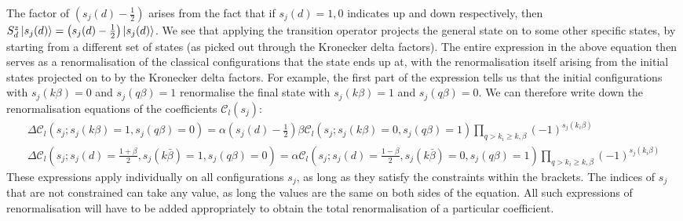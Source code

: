 \documentclass[prb]{revtex4-2}
\begin{document}
The factor of \(\left(s_j(d) - \frac{1}{2}\right)\) arises from the fact that if \(s_j(d)=1,0\) indicates up and down respectively, then \(S_d^z\ket{s_j(d)} = \left(s_j(d) - \frac{1}{2}\right)\ket{s_j(d)}\). We see that applying the transition operator projects the general state on to some other specific states, by starting from a different set of states (as picked out through the Kronecker delta factors). The entire expression in the above equation then serves as a renormalisation of the classical configurations that the state ends up at, with the renormalisation itself arising from the initial states projected on to by the Kronecker delta factors. For example, the first part of the expression tells us that the initial configurations with \(s_j(k\beta) = 0\) and \(s_j(q\beta)=1\) renormalise the final state with \(s_j(k\beta)=1\) and \(s_j(q\beta)=0\). We can therefore write down the renormalisation equations of the coefficients \(\mathcal{C}_l(s_j)\):
\begin{gather}
	  \Delta \mathcal{C}_l\left(s_j;s_j(k\beta) = 1, s_j(q\beta)=0\right) = \alpha \left(s_j(d) - \frac{1}{2}\right) \beta \mathcal{C}_l\left(s_j;s_j(k\beta) = 0, s_j(q\beta)=1\right)\prod_{q > k_i \geq k,\beta}\left( -1 \right)^{s_j(k_i\beta)}\label{particle_renormalisation1}\\
	\Delta \mathcal{C}_l\left(s_j;s_j(d) = \frac{1 + \beta}{2}, s_j(k\bar\beta) = 1, s_j(q\beta)=0\right) = \alpha \mathcal{C}_l\left(s_j;s_j(d) = \frac{1 - \beta}{2}, s_j(k\bar\beta) = 0, s_j(q\beta)=1\right)\prod_{q > k_i \geq k,\beta}\left( -1 \right)^{s_j(k_i\beta)}\label{particle_renormalisation2}
\end{gather}
These expressions apply individually on all configurations \(s_j\), as long as they satisfy the constraints within the brackets. The indices of \(s_j\) that are not constrained can take any value, as long the values are the same on both sides of the equation. All such expressions of renormalisation will have to be added appropriately to obtain the total renormalisation of a particular coefficient.
\end{document}
